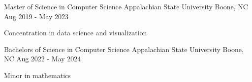 

\begin{cventries}

  \cventry
    {Master of Science in Computer Science} %
    {Appalachian State University} %
    {Boone, NC} %
    {Aug 2019 - May 2023} %
    {
      \begin{cvitems} %
        \item {Concentration in data science and visualization}
      \end{cvitems}
    }
    
  \cventry
    {Bachelors of Science in Computer Science} %
    {Appalachian State University} %
    {Boone, NC} %
    {Aug 2022 - May 2024} %
    {
      \begin{cvitems} %
        \item {Minor in mathematics}
      \end{cvitems}
    }
\end{cventries}
